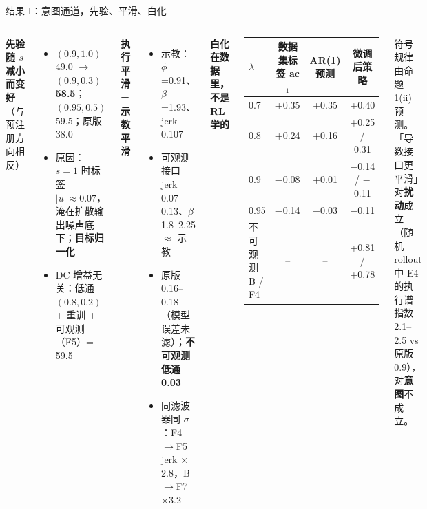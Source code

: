 \documentclass[10pt,aspectratio=169]{beamer}
\newcommand{\hl}[1]{\textcolor{good}{\textbf{#1}}}
\begin{document}
\begin{frame}[shrink=5]{结果 I：意图通道，先验、平滑、白化}
\begin{columns}[T]
\textbf{先验随 $s$ 减小而变好}（与预注册方向相反）
\begin{itemize}
\item $(0.9,1.0)$ 49.0 $\to$ $(0.9,0.3)$ \hl{58.5}；$(0.95,0.5)$ 59.5；原版 38.0
\item 原因：$s=1$ 时标签 $|u|\approx0.07$，淹在扩散输出噪声底下；\textbf{目标归一化}
\item DC 增益无关：低通 $(0.8,0.2)$ + 重训 + 可观测（F5）= 59.5
\end{itemize}
\textbf{执行平滑 = 示教平滑}
\begin{itemize}
\item 示教：$\phi$=0.91、$\beta$=1.93、jerk 0.107
\item 可观测接口 jerk 0.07--0.13、$\beta$ 1.8--2.25 $\approx$ 示教
\item 原版 0.16--0.18（模型误差未滤）；\hl{不可观测低通 0.03}
\item 同滤波器同 $\sigma$：F4$\to$F5 jerk $\times$2.8，B$\to$F7 $\times$3.2
\end{itemize}
\textbf{白化在数据里，不是 RL 学的}
\begin{center}\small
\begin{tabular}{lccc}
\toprule
$\lambda$ & 数据集标签 ac$_1$ & AR(1) 预测 & 微调后策略 \\
\midrule
0.7 & +0.35 & +0.35 & +0.40 \\
0.8 & +0.24 & +0.16 & +0.25 / 0.31 \\
0.9 & $-$0.08 & +0.01 & $-$0.14 / $-$0.11 \\
0.95 & $-$0.14 & $-$0.03 & $-$0.11 \\
\midrule
不可观测 B / F4 & -- & -- & +0.81 / +0.78 \\
\bottomrule
\end{tabular}
\end{center}
\small 符号规律由命题 1(ii) 预测。「导数接口更平滑」对\textbf{扰动}成立（随机 rollout 中 E4 的执行谱指数 2.1--2.5 vs 原版 0.9），对\textbf{意图}不成立。
\end{columns}
\end{frame}
\end{document}
